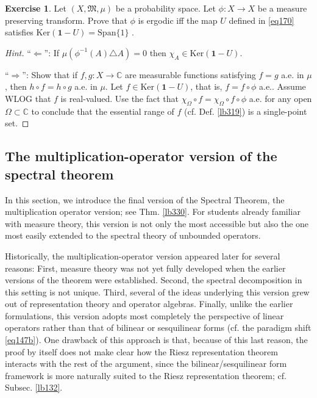 \documentclass[12pt,b5paper,notitlepage]{article}
\theoremstyle{definition}
\newtheorem{exe}[df]{Exercise}
\theoremstyle{plain}
\newcommand{\fk}{\mathfrak}
\newcommand{\idt}{\mathbf{1}}
\newcommand{\Span}{\mathrm{Span}}
\newcommand{\Cbb}{\mathbb C}
\newcommand{\Ker}{\mathrm{Ker}}
\numberwithin{equation}{section}
\begin{document}
\begin{exe}\label{lb320}
Let $(X,\fk M,\mu)$ be a probability space. Let $\phi:X\rightarrow X$ be a measure preserving transform. Prove that $\phi$ is ergodic iff the map $U$ defined in \eqref{eq170} satisfies $\Ker(\idt-U)=\Span\{1\}$ .
\end{exe}

\begin{proof}[Hint]
``$\Leftarrow$'': If $\mu(\phi^{-1}(A)\triangle A)=0$ then $\chi_A\in\Ker(\idt-U)$.

``$\Rightarrow$'': Show that if $f,g:X\rightarrow\Cbb$ are measurable functions satisfying $f=g$ a.e. in $\mu$, then $h\circ f=h\circ g$ a.e. in $\mu$. Let $f\in\Ker(\idt-U)$, that is, $f=f\circ\phi$ a.e.. Assume WLOG that $f$ is real-valued. Use the fact that $\chi_\Omega\circ f=\chi_\Omega\circ f\circ\phi$ a.e. for any open $\Omega\subset\Cbb$ to conclude that the essential range of $f$ (cf. Def. \ref{lb319}) is a single-point set.
\end{proof}



\subsection{The multiplication-operator version of the spectral theorem}\label{lb426}


In this section, we introduce the final version of the Spectral Theorem, the multiplication operator version; see Thm. \ref{lb330}. For students already familiar with measure theory, this version is not only the most accessible but also the one most easily extended to the spectral theory of unbounded operators.

Historically, the multiplication-operator version appeared later for several reasons: First, measure theory was not yet fully developed when the earlier versions of the theorem were established. Second, the spectral decomposition in this setting is not unique. Third, several of the ideas underlying this version grew out of representation theory and operator algebras. Finally, unlike the earlier formulations, this version adopts most completely the perspective of linear operators rather than that of bilinear or sesquilinear forms (cf. the paradigm shift \eqref{eq147b}). One drawback of this approach is that, because of this last reason, the proof by itself does not make clear how the Riesz representation theorem interacts with the rest of the argument, since the bilinear/sesquilinear form framework is more naturally suited to the Riesz representation theorem; cf. Subsec. \ref{lb132}.
\end{document}
